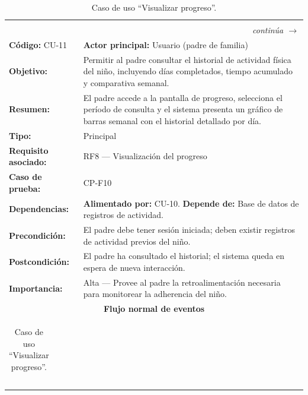 				\begingroup
					\setlength{\LTpre}{6pt}\setlength{\LTpost}{6pt}
					\renewcommand{\arraystretch}{1.20}
					\footnotesize
					\begin{longtable}{p{4cm}p{10.4cm}}
						\caption{Caso de uso ``Visualizar progreso''.}\label{tab:cu11}\\
						\hline
						\rowcolor{headblue}\multicolumn{2}{c}{\textbf{\color{white}Caso de uso ``Visualizar progreso''}}\\\hline
						\endfirsthead
						\hline\rowcolor{headblue}\multicolumn{2}{c}{\textbf{\color{white}Caso de uso ``Visualizar progreso'' (continuación)}}\\\hline
						\endhead
						\hline\multicolumn{2}{r}{\footnotesize\itshape continúa $\rightarrow$}\\\endfoot
						\hline\endlastfoot
						\textbf{Código:} CU-11 & \textbf{Actor principal:} Usuario (padre de familia)\\\hline
						\textbf{Objetivo:} & Permitir al padre consultar el historial de actividad física del niño, incluyendo días completados, tiempo acumulado y comparativa semanal.\\
						\textbf{Resumen:} & El padre accede a la pantalla de progreso, selecciona el período de consulta y el sistema presenta un gráfico de barras semanal con el historial detallado por día.\\
						\textbf{Tipo:} & Principal\\
						\textbf{Requisito asociado:} & RF8 --- Visualización del progreso\\
						\textbf{Caso de prueba:} & CP-F10\\
						\textbf{Dependencias:} & \textbf{Alimentado por:} CU-10. \textbf{Depende de:} Base de datos de registros de actividad.\\
						\textbf{Precondición:} & El padre debe tener sesión iniciada; deben existir registros de actividad previos del niño.\\
						\textbf{Postcondición:} & El padre ha consultado el historial; el sistema queda en espera de nueva interacción.\\
						\textbf{Importancia:} & Alta --- Provee al padre la retroalimentación necesaria para monitorear la adherencia del niño.\\\hline
						\multicolumn{2}{c}{\cellcolor{grpgray}\textbf{Flujo normal de eventos}}\\\hline
						\multicolumn{2}{p{14.4cm}}{%
							\begin{tabular}{p{7.0cm}p{7.0cm}}

\end{tabular}}
\end{longtable}
